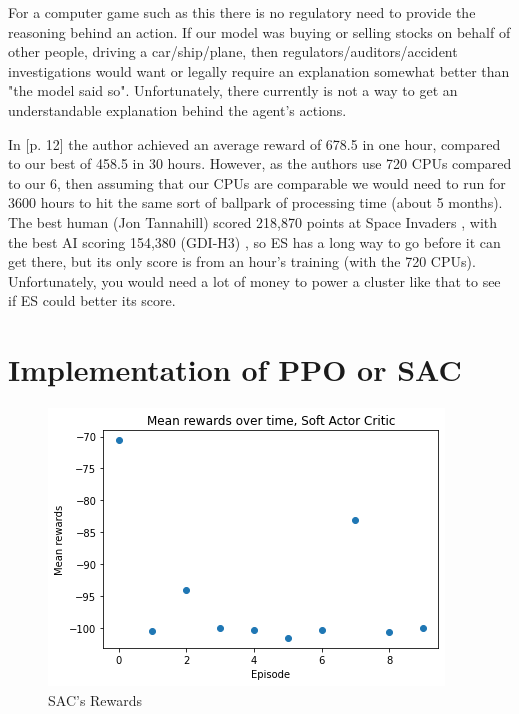 \documentclass[a4pape, 11pt, english]{article}
\begin{document}
For a computer game such as this there is no regulatory need to provide the reasoning behind an action. If our model was buying or selling stocks on behalf of other people, driving a car/ship/plane, then regulators/auditors/accident investigations would want or legally require an explanation somewhat better than "the model said so". Unfortunately, there currently is not a way to get an understandable explanation behind the agent's actions.

In \citep{salimans_evolution_2017}[p. 12] the author achieved an average reward of 678.5 in one hour, compared to our best of 458.5 in 30 hours. However, as the authors use 720 CPUs compared to our 6, then assuming that our CPUs are comparable we would need to run for 3600 hours to hit the same sort of ballpark of processing time (about 5 months). The best human (Jon Tannahill) scored 218,870 points at Space Invaders \citep{day_beating_2018}, with the best AI scoring 154,380 (GDI-H3) \citep{papers_with_code_papers_nodate}, so ES has a long way to go before it can get there, but its only score is from an hour's training (with the 720 CPUs). Unfortunately, you would need a lot of money to power a cluster like that to see if ES could better its score.

\section{Implementation of PPO or SAC}
\begin{figure}[h!]
	\begin{center}
		\includegraphics{img/SAC.png}
		\caption{SAC's Rewards}
		\label{fig:SAC}
	\end{center}
\end{figure}
\end{document}
